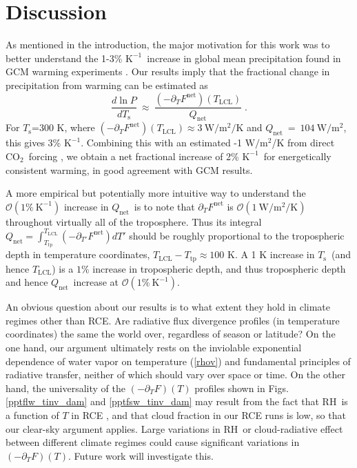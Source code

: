 \documentclass[10pt]{article}
\newcommand{\beqn}{\begin{equation}}
\newcommand{\eeqn}{\end{equation}}
\newcommand{\eqnref}[1]{(\ref{#1})}
\newcommand{\ppt}{\ensuremath{\partial_T}}
\newcommand{\cotwo}{\ensuremath{\mathrm{CO_2}}}
\newcommand{\Qnet}{\ensuremath{Q_\mathrm{net}}}
\newcommand{\Fnet}{\ensuremath{F^\mathrm{net}}}
\newcommand{\tauk}{\ensuremath{\tau_k}}
\newcommand{\Wmsq}{\ensuremath{\mathrm{W/m^2}}}
\newcommand{\rhov}{\ensuremath{\rho_\mathrm{v}}}
\newcommand{\Ts}{\ensuremath{T_\mathrm{s}}}
\newcommand{\RH}{\ensuremath{\mathrm{RH}}}
\newcommand{\Tlcl}{\ensuremath{T_\mathrm{LCL}}}
\newcommand{\Ttp}{\ensuremath{T_\mathrm{tp}}}
\newcommand{\Kinverse}{\ensuremath{\mathrm{K^{-1}}}}
\begin{document}
\section{Discussion} \label{sec_summary}

As mentioned in the introduction, the major motivation for this work was to better understand the 1-3\% \Kinverse\ increase in global mean precipitation found in GCM warming experiments \citep{stephens2008, lambert2008,held2006}.  Our results imply that the fractional change in precipitation from warming can be estimated as 
	\beqn
		\frac{d \ln  P}{d \Ts} \ \approx\  \frac{(-\ppt \Fnet)(\Tlcl)}{\Qnet} \; .
	\label{precip_estimate}
	\eeqn
For \Ts=300 K, where $(-\ppt \Fnet)(\Tlcl) \approx 3 \ \Wmsq/\mathrm{K}$ and $\Qnet\ =\  104\ \Wmsq$, this  gives  3\% \Kinverse. Combining this with an estimated -1 \Wmsq/K from direct \cotwo\ forcing \citep{pendergrass2014}, we obtain a net fractional increase of 2\% \Kinverse\ for energetically consistent warming, in good agreement with GCM results.

A more empirical but potentially more intuitive way to understand the $\mathcal{O}(1 \%\ \Kinverse)$ increase in \Qnet\ is to note that $\ppt \Fnet$ is $\mathcal{O}(1\ \Wmsq/\mathrm{K})$ throughout virtually all of the troposphere. Thus its integral $\Qnet =  \int_{\Ttp}^{\Tlcl} (-\partial_{T'} \Fnet) dT'$  should be roughly proportional to the tropospheric depth in temperature coordinates, $\Tlcl - \Ttp \approx 100$ K.  A 1 K increase in \Ts\ (and hence \Tlcl) is a $1\%$ increase in tropospheric depth, and thus tropospheric depth and hence \Qnet\  increase at  $\mathcal{O}(1 \%\ \Kinverse)$.

An obvious question about our results is to what extent they hold in climate regimes other than RCE.  Are radiative  flux divergence profiles (in temperature coordinates) the same the world over, regardless of season or latitude? On the one hand,  our argument ultimately rests on the inviolable exponential dependence of water vapor on temperature \eqnref{rhov} and fundamental principles of radiative transfer, neither of which should vary over space or time. On the other hand,  the universality of the $(-\ppt F)(T)$ profiles shown in Figs. \ref{pptflw_tinv_dam} and \ref{pptfsw_tinv_dam}  may result from the fact that \RH\ is a function of $T$ in RCE \citep{romps2014}, and that cloud fraction in our RCE runs is low, so that our clear-sky argument applies. Large variations in \RH\ or cloud-radiative effect between different climate regimes could cause significant variations in  $(-\ppt F)(T)$. Future work will investigate this.
\end{document}
